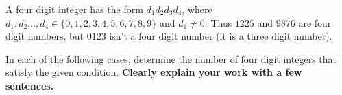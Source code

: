\documentclass[12pt,fleqn,answers]{exam}
\begin{document}
\begin{questions} 


    \question A four digit integer has the form $d_1 d_2 d_3 d_4$,
    where $d_1, d_2 \dots, d_4 \in \{0,1,2,3,4,5,6,7,8,9\}$ and $d_1 \neq 0$.  
    Thus $1225$ and $9876$ are four digit numbers, but $0123$ isn't a four digit number 
    (it is a three digit number).
    
    In each of the following cases, determine the number of four digit integers 
    that satisfy the given condition. 
    \textbf{Clearly explain your work with a few sentences.}



\end{questions}
\end{document}
